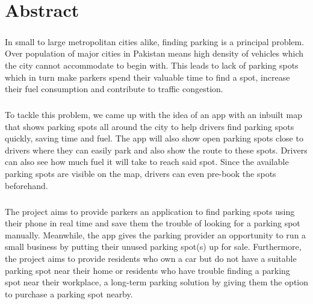 \chapter*{Abstract}


    \paragraph*{}
        In small to large metropolitan cities alike, finding parking is a principal problem.\\
        Over population of major cities in Pakistan means high density of vehicles which the city cannot accommodate to begin with. This leads to lack of parking spots which in turn make parkers spend their valuable time to find a spot, increase their fuel consumption and contribute to traffic congestion.
    
    \paragraph*{}
        To tackle this problem, we came up with the idea of an app with an inbuilt map that shows parking spots all around the city to help drivers find parking spots quickly, saving time and fuel. The app will also show open parking spots close to drivers where they can easily park and also show the route to these spots. Drivers can also see how much fuel it will take to reach said spot. Since the available parking spots are visible on the map, drivers can even pre-book the spots beforehand.
        
    \paragraph*{}
        The project aims to provide parkers an application to find parking spots using their phone in real time and save them the trouble of looking for a parking spot manually. Meanwhile, the app gives the parking provider an opportunity to run a small business by putting their unused parking spot(s) up for sale. Furthermore, the project aims to provide residents who own a car but do not have a suitable parking spot near their home or residents who have trouble finding a parking spot near their workplace, a long-term parking solution by giving them the option to purchase a parking spot nearby.